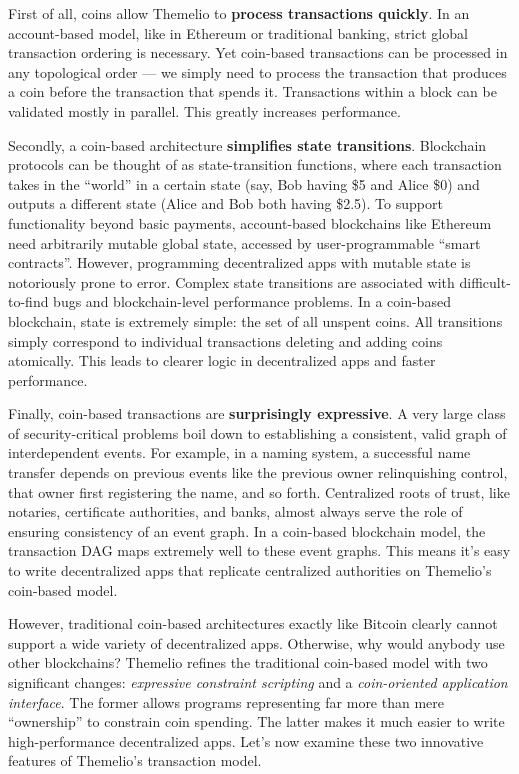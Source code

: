 \documentclass[]{article}
\begin{document}
First of all, coins allow Themelio to \textbf{process transactions
quickly}. In an account-based model, like in Ethereum or traditional
banking, strict global transaction ordering is necessary. Yet coin-based
transactions can be processed in any topological order --- we simply
need to process the transaction that produces a coin before the
transaction that spends it. Transactions within a block can be validated
mostly in parallel. This greatly increases performance.

Secondly, a coin-based architecture \textbf{simplifies state
transitions}. Blockchain protocols can be thought of as state-transition
functions, where each transaction takes in the ``world'' in a certain
state (say, Bob having \$5 and Alice \$0) and outputs a different state
(Alice and Bob both having \$2.5). To support functionality beyond basic
payments, account-based blockchains like Ethereum need arbitrarily
mutable global state, accessed by user-programmable ``smart contracts''.
However, programming decentralized apps with mutable state is
notoriously prone to error. Complex state transitions are associated
with difficult-to-find bugs and blockchain-level performance problems.
In a coin-based blockchain, state is extremely simple: the set of all
unspent coins. All transitions simply correspond to individual
transactions deleting and adding coins atomically. This leads to clearer
logic in decentralized apps and faster performance.

Finally, coin-based transactions are \textbf{surprisingly expressive}. A
very large class of security-critical problems boil down to establishing
a consistent, valid graph of interdependent events. For example, in a
naming system, a successful name transfer depends on previous events
like the previous owner relinquishing control, that owner first
registering the name, and so forth. Centralized roots of trust, like
notaries, certificate authorities, and banks, almost always serve the
role of ensuring consistency of an event graph. In a coin-based
blockchain model, the transaction DAG maps extremely well to these event
graphs. This means it's easy to write decentralized apps that replicate
centralized authorities on Themelio's coin-based model.

However, traditional coin-based architectures exactly like Bitcoin
clearly cannot support a wide variety of decentralized apps. Otherwise,
why would anybody use other blockchains? Themelio refines the
traditional coin-based model with two significant changes:
\emph{expressive constraint scripting} and a \emph{coin-oriented
application interface}. The former allows programs representing far more
than mere ``ownership'' to constrain coin spending. The latter makes it
much easier to write high-performance decentralized apps. Let's now
examine these two innovative features of Themelio's transaction model.
\end{document}
